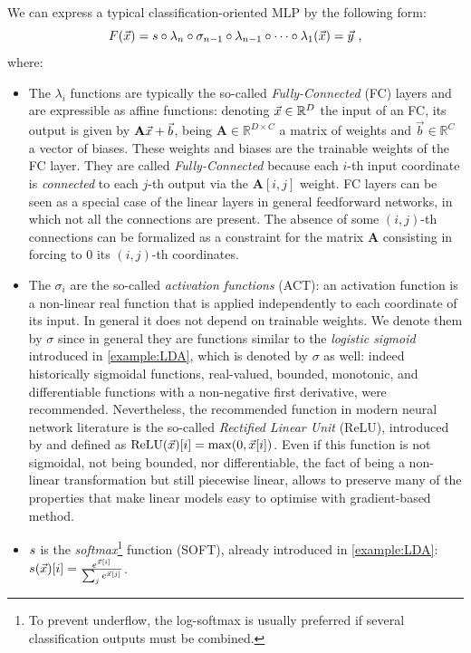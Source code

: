 We can express a typical classification-oriented MLP by the following form:
\begin{equation}\label{eq:MLP}
F(\vec{x}) = s\circ\lambda_n\circ\sigma_{n-1}\circ\lambda_{n-1}\circ\dots\circ \lambda_1(\vec{x})=\vec{y} \mbox{ ,}
\end{equation}
where:
\begin{itemize}
\item The $\lambda_i$ functions are typically the so-called \emph{Fully-Connected} (FC) layers and are expressible as affine functions: denoting $\vec{x}\in\mathbb{R}^D$ the input of an FC, its output is given by $\textbf{A}\vec{x} + \vec{b}$, being $\textbf{A}\in\mathbb{R}^{D\times C}$ a matrix of weights and $\vec{b}\in\mathbb{R}^C$ a vector of biases. These weights and biases are the trainable weights of the FC layer. They are called \emph{Fully-Connected} because each $i$-th input coordinate is \emph{connected} to each $j$-th output via the $\textbf{A}[i,j]$ weight. FC layers can be seen as a special case of the linear layers in general feedforward networks, in which not all the connections are present. The absence of some $(i,j)$-th connections can be formalized as a constraint for the matrix $\textbf{A}$ consisting in forcing to $0$ its $(i,j)$-th coordinates.

\item  The $\sigma_i$ are the so-called \emph{activation functions} (ACT): an activation function is a non-linear real function that is applied independently to each coordinate of its input. In general it does not depend on trainable weights. We denote them by $\sigma$ since in general they are functions similar to the \emph{logistic sigmoid} introduced in \ref{example:LDA}, which is denoted by $\sigma$ as well: indeed historically sigmoidal functions, \ie real-valued, bounded, monotonic, and differentiable functions with a non-negative first derivative, were recommended. Nevertheless, the recommended function in modern neural network literature is the so-called \emph{Rectified Linear Unit} (ReLU), introduced by \cite{nair2010rectified} and defined as $\mathrm{ReLU}(\vec{x})[i] = \max(0,\vec{x}[i])$. Even if this function is not sigmoidal, not being bounded, nor differentiable, the fact of being a non-linear transformation but still piecewise linear, allows to preserve many of the properties that make linear models easy to optimise with gradient-based method.
 

\item $s$ is the \emph{softmax}\footnote{To prevent underflow, the log-softmax is usually preferred if several classification outputs must be combined.} function (SOFT), already introduced in \ref{example:LDA}: $s(\vec{x})[i] = \frac{e^{\vec{x}[i]}}{\sum_{j}e^{\vec{x}[j]}}$.
\end{itemize}
 

